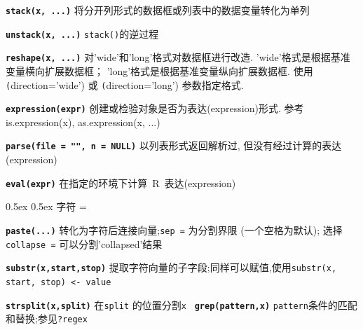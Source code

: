 \documentclass[landscape]{article}
\makeatletter
\renewcommand\section{\@startsection{section}{1}{0mm}%
                                     {0.5ex}%
                                     {0.5ex}%
                                {\color{black}\normalfont\large\bfseries}}
\newcommand{\code}{\texttt}
\newcommand{\bcode}[1]{\texttt{\textbf{#1}}}
\makeatother
\begin{document}
\begin{multicols*}{3}
\bcode{stack(x, ...)}   将分开列形式的数据框或列表中的数据变量转化为单列

\bcode{unstack(x, ...)} \code{stack()}的逆过程

\bcode{reshape(x, ...)} 对'wide'和'long'格式对数据框进行改造.
    'wide'格式是根据基准变量横向扩展数据框；
    'long'格式是根据基准变量纵向扩展数据框.
    使用    \code(direction='wide') 或  \code(direction='long') 参数指定格式.

\bcode{expression(expr)}    创建或检验对象是否为表达(expression)形式. 参考 is.expression(x), as.expression(x, ...)

\bcode{parse(file = "", n = NULL)}  以列表形式返回解析过, 但没有经过计算的表达(expression)

\bcode{eval(expr)}  在指定的环境下计算~R~表达(expression)



\section{字符}
\everypar={\hangindent=9mm}

\bcode{paste(...)} 转化为字符后连接向量;\code{sep =} 为分割界限 (一个空格为默认);
选择\code{collapse =} 可以分割'collapsed'结果


\bcode{substr(x,start,stop)} 提取字符向量的子字段;同样可以赋值,使用\code{substr(x, start, stop) <- value}

\bcode{strsplit(x,split)} 在\code{split} 的位置分割\code{x}~
\bcode{grep(pattern,x)} \code{pattern}条件的匹配和替换;参见\code{?regex}


\end{multicols*}
\end{document}
